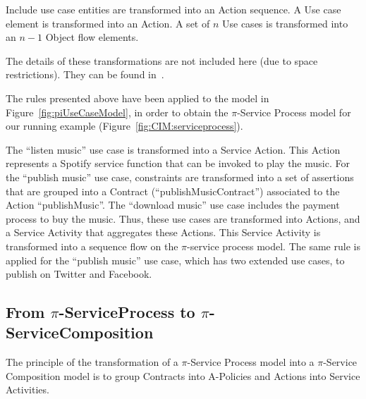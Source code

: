 {\sf Include} use case entities are transformed into an {\sf Action} sequence.
A {\sc Use case} element is transformed into an {\sf Action}. 
A set of $n$ {\sc Use cases} is transformed into an  $n-1$ {\sf Object flow} elements. 

The details of these transformations are not included here (due to space restrictions).
They can be found in~\cite{SouzaNeto:2012}.

\begin{example}\label{ex:toPublicMusicT1}
The rules presented above have been applied to the model in Figure~\ref{fig:piUseCaseModel}, in order to obtain the $\pi$-Service Process model for our running example (Figure~\ref{fig:CIM:serviceprocess}).

The ``listen music'' use case is transformed into a Service Action. 
This Action  represents a Spotify service function that can be invoked to play the music. 
For the ``publish music'' use case,  constraints are transformed into a set of assertions that are grouped into a Contract ({\sf ``publishMusicContract''}) associated to the Action {\sf ``publishMusic''}. 
The ``download music'' use case  includes the payment process to buy the music. 
Thus, these use cases  are transformed into {\sf Actions}, and a {\sf Service Activity} that aggregates these {\sf Actions}.   
This \textsf{Service Activity} is transformed into a sequence flow on the $\pi$-service process model.
The same rule is applied for the ``publish music'' use case, which has two extended use cases, to publish on Twitter and Facebook.
 \end{example}


\subsection{From $\pi$-ServiceProcess to $\pi$-ServiceComposition}

The  principle of the transformation  of a  $\pi$-Service Process model into a $\pi$-Service Composition model is to group {\sf Contracts} into {\sf A-Policies} and {\sf Actions} into {\sf Service Activities}.   

